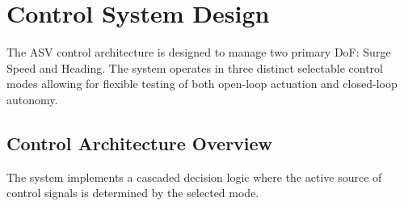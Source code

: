 \documentclass[12pt, a4paper, oneside]{report}
\begin{document}
\section{Control System Design}
\label{sec:control_system}

The ASV control architecture is designed to manage two primary DoF: Surge Speed and Heading. The system operates in three distinct selectable control modes allowing for flexible testing of both open-loop actuation and closed-loop autonomy.

\subsection{Control Architecture Overview}
The system implements a cascaded decision logic where the active source of control signals is determined by the selected mode. \\\\\\\\\\\\\\\\\\
\end{document}
